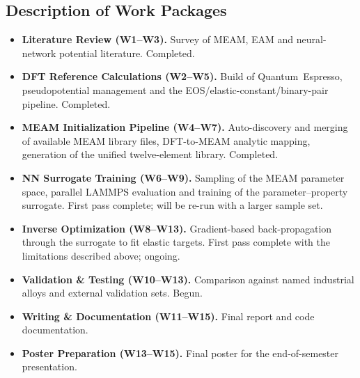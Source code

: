 \subsection{Description of Work Packages}
\begin{itemize}
	\item \textbf{Literature Review (W1--W3).} Survey of MEAM, EAM and
	      neural-network potential literature. Completed.
	\item \textbf{DFT Reference Calculations (W2--W5).} Build of
	      Quantum~Espresso, pseudopotential management and the
	      EOS/elastic-constant/binary-pair pipeline. Completed.
	\item \textbf{MEAM Initialization Pipeline (W4--W7).} Auto-discovery
	      and merging of available MEAM library files, DFT-to-MEAM
	      analytic mapping, generation of the unified twelve-element
	      library. Completed.
	\item \textbf{NN Surrogate Training (W6--W9).} Sampling of the MEAM
	      parameter space, parallel LAMMPS evaluation and training of
	      the parameter--property surrogate. First pass complete; will
	      be re-run with a larger sample set.
	\item \textbf{Inverse Optimization (W8--W13).} Gradient-based
	      back-propagation through the surrogate to fit elastic
	      targets. First pass complete with the limitations described
	      above; ongoing.
	\item \textbf{Validation \& Testing (W10--W13).} Comparison against
	      named industrial alloys and external validation sets. Begun.
	\item \textbf{Writing \& Documentation (W11--W15).} Final report
	      and code documentation.
	\item \textbf{Poster Preparation (W13--W15).} Final poster for the
	      end-of-semester presentation.
\end{itemize}
